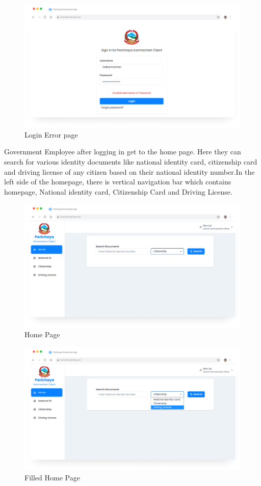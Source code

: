    
    

     \begin{figure}[H]
        \centering
        \includegraphics[width=0.6\linewidth]{images/results/web/WebLoginErrorPage.png}
        \caption[Login Error page ]{Login Error page}
        \label{fig:WebLoginErrorPage.png}
        \end{figure}
    Government Employee after logging in get to the home page. Here they can search for various identity documents like national identity card, citizenship card and driving license of any citizen based on their national identity number.In the left side of the homepage, there is vertical navigation bar which contains homepage, National identity card, Citizenship Card and Driving License.

        \begin{figure}[H]
        \centering
        \includegraphics[width=0.8\linewidth]{images/results/web/WebHomePage.png}
      \caption[Home Page]{Home Page}
        \label{fig:WebHomePage.png}
        \end{figure}

           \begin{figure}[H]
        \centering
        \includegraphics[width=0.8\linewidth]{images/results/web/WebHomePage2.png}
        \caption[Filled Home Page]{Filled Home Page}
        \label{fig:WebHomePage2.png}
        \end{figure}

